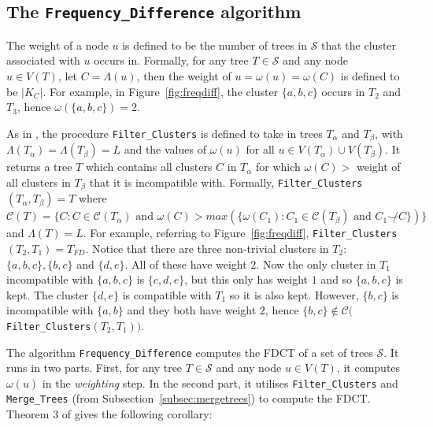 \documentclass{article}
\newcommand{\compatible}{\smile}
\newcommand{\leafset}{\Lambda}
\newcommand{\weight}{\omega}
\begin{document}
    \subsection{The \texttt{Frequency\_Difference} algorithm}

    The weight of a node $u$ is defined to be the number of trees in $\mathcal{S}$ that the cluster associated with $u$ occurs in. Formally, for any tree $T \in \mathcal{S}$ and any node $u \in V(T)$, let $C = \leafset(u)$, then the weight of $u = \weight(u) = \weight(C)$ is defined to be $|K_C|$. For example, in Figure~\ref{fig:freqdiff}, the cluster $\{a, b, c\}$ occurs in $T_2$ and $T_3$, hence $\weight(\{a, b, c\}) = 2$.

    As in \cite{jansson2018algorithms}, the procedure \texttt{Filter\_Clusters} is defined to take in trees $T_\alpha$ and $T_\beta$, with $\leafset(T_\alpha) = \leafset(T_\beta) = L$ and the values of $\weight(u)$ for all $u \in V(T_\alpha) \cup V(T_\beta)$. It returns a tree $T$ which contains all clusters $C$ in $T_\alpha$ for which $\weight(C) > $ weight of all clusters in $T_\beta$ that it is incompatible with. Formally, \texttt{Filter\_Clusters}$(T_\alpha, T_\beta) = T$ where $\mathcal{C}(T) = \{C : C \in \mathcal{C}(T_\alpha) \text{ and } \weight(C) > max(\{\weight(C_1) : C_1 \in \mathcal{C}(T_\beta) \text{ and } C_1 \not\compatible C\})\}$ and $\leafset(T) = L$. For example, referring to Figure~\ref{fig:freqdiff}, \texttt{Filter\_Clusters}$(T_2, T_1) = T_{FD}$. Notice that there are three non-trivial clusters in $T_2$: $\{a, b, c\}, \{b, c\}$ and $\{d, e\}$. All of these have weight $2$. Now the only cluster in $T_1$ incompatible with $\{a, b, c\}$ is $\{c, d, e\}$, but this only has weight $1$ and so $\{a, b, c\}$ is kept. The cluster $\{d, e\}$ is compatible with $T_1$ so it is also kept. However, $\{b, c\}$ is incompatible with $\{a, b\}$ and they both have weight $2$, hence $\{b, c\} \not\in \mathcal{C}($\texttt{Filter\_Clusters}$(T_2, T_1))$.

    The algorithm \texttt{Frequency\_Difference} \cite{jansson2018algorithms} computes the FDCT of a set of trees $\mathcal{S}$. It runs in two parts. First, for any tree $T \in \mathcal{S}$ and any node $u \in V(T)$, it computes $\weight(u)$ in the \textit{weighting} step. In the second part, it utilises \texttt{Filter\_Clusters} and \texttt{Merge\_Trees} (from Subsection~\ref{subsec:mergetrees}) to compute the FDCT. Theorem 3 of \cite{jansson2018algorithms} gives the following corollary:
    \newline
\end{document}
